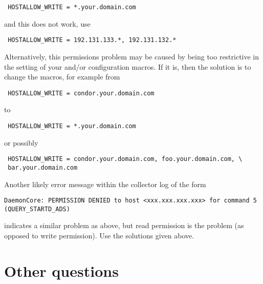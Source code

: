 \begin{description}
\begin{enumerate}
\begin{verbatim}
 HOSTALLOW_WRITE = *.your.domain.com
\end{verbatim}

   and this does not work, use

\begin{verbatim}
 HOSTALLOW_WRITE = 192.131.133.*, 192.131.132.*
\end{verbatim}
\end{enumerate}

Alternatively, this permissions problem
may be caused by being too restrictive in the setting of
your  and/or
 configuration macros.
If it is, then the solution is to change the macros,
for example from
\begin{verbatim}
 HOSTALLOW_WRITE = condor.your.domain.com
\end{verbatim}
to
\begin{verbatim}
 HOSTALLOW_WRITE = *.your.domain.com
\end{verbatim}
or possibly
\begin{verbatim}
 HOSTALLOW_WRITE = condor.your.domain.com, foo.your.domain.com, \
 bar.your.domain.com 
\end{verbatim}


Another likely error message within the collector log of the form
\begin{verbatim}
DaemonCore: PERMISSION DENIED to host <xxx.xxx.xxx.xxx> for command 5 (QUERY_STARTD_ADS)
\end{verbatim}
indicates a similar problem as above, but read permission
is the problem (as opposed to write permission).
Use the solutions given above.

\end{description}
\section{Other questions}

